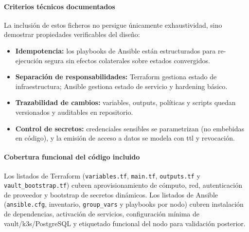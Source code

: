 \documentclass[runningheads]{llncs}
\begin{document}
\paragraph{Criterios técnicos documentados}
La inclusión de estos ficheros no persigue únicamente exhaustividad, sino demostrar propiedades verificables del diseño:
\begin{itemize}
    \item \textbf{Idempotencia:} los playbooks de Ansible están estructurados para re-ejecución segura sin efectos colaterales sobre estados convergidos.
    \item \textbf{Separación de responsabilidades:} Terraform gestiona estado de infraestructura; Ansible gestiona estado de servicio y hardening básico.
    \item \textbf{Trazabilidad de cambios:} variables, outputs, políticas y scripts quedan versionados y auditables en repositorio.
    \item \textbf{Control de secretos:} credenciales sensibles se parametrizan (no embebidas en código), y la emisión de acceso a datos se modela con \gls{ttl} y revocación.
\end{itemize}

\paragraph{Cobertura funcional del código incluido}
Los listados de Terraform (\texttt{variables.tf}, \texttt{main.tf}, \texttt{outputs.tf} y \texttt{vault\_bootstrap.tf}) cubren aprovisionamiento de cómputo, red, autenticación de proveedor y bootstrap de secretos dinámicos. Los listados de Ansible (\texttt{ansible.cfg}, inventario, \texttt{group\_vars} y playbooks por nodo) cubren instalación de dependencias, activación de servicios, configuración mínima de \gls{vault}/\gls{k3s}/PostgreSQL y etiquetado funcional del nodo para validación posterior.






\end{document}
